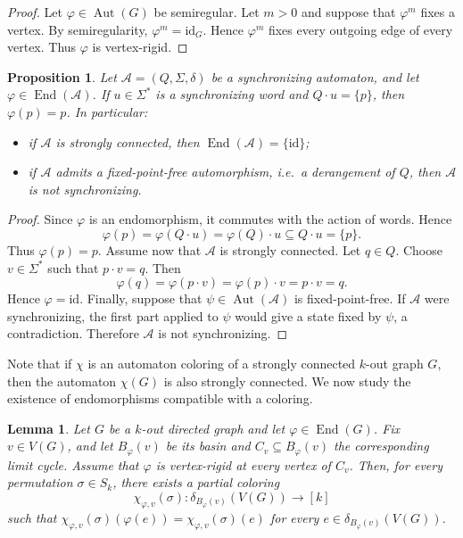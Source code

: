 \documentclass[a4paper,10pt]{amsart}
\theoremstyle{plain}
\newtheorem{lemma}[theorem]{Lemma}
\newtheorem{proposition}[theorem]{Proposition}
\theoremstyle{definition}
\DeclareMathOperator{\Aut}{Aut}
\DeclareMathOperator{\End}{End}
\newcommand{\id}{\mathrm{id}}
\begin{document}
\begin{proof}
Let $\varphi\in\Aut(G)$ be semiregular. Let $m>0$ and suppose that $\varphi^m$ fixes a vertex.
By semiregularity, $\varphi^m=\id_G$. Hence $\varphi^m$ fixes every outgoing edge of every vertex.
Thus $\varphi$ is vertex-rigid.
\end{proof}
\begin{proposition}\label{pro: synch and automorphisms}
Let $\mathcal A=(Q,\Sigma,\delta)$ be a synchronizing automaton, and let $\varphi\in\End(\mathcal A)$.
If $u\in\Sigma^*$ is a synchronizing word and $Q\cdot u=\{p\}$, then $\varphi(p)=p$.
In particular:
\begin{itemize}
\item if $\mathcal A$ is strongly connected, then $\End(\mathcal A)=\{\id\}$;
\item if $\mathcal A$ admits a fixed-point-free automorphism, i.e.\ a derangement of $Q$, then $\mathcal A$ is not synchronizing.
\end{itemize}
\end{proposition}
\begin{proof}
Since $\varphi$ is an endomorphism, it commutes with the action of words. Hence
\[
\varphi(p)
=
\varphi(Q\cdot u)
=
\varphi(Q)\cdot u
\subseteq
Q\cdot u
=
\{p\}.
\]
Thus $\varphi(p)=p$. Assume now that $\mathcal A$ is strongly connected. Let $q\in Q$. Choose $v\in\Sigma^*$ such that
$p\cdot v=q$. Then
\[
\varphi(q)
=
\varphi(p\cdot v)
=
\varphi(p)\cdot v
=
p\cdot v
=
q.
\]
Hence $\varphi=\id$.
Finally, suppose that $\psi\in\Aut(\mathcal A)$ is fixed-point-free. If $\mathcal A$ were synchronizing,
the first part applied to $\psi$ would give a state fixed by $\psi$, a contradiction. Therefore
$\mathcal A$ is not synchronizing.
\end{proof}
Note that if $\chi$ is an automaton coloring of a strongly connected $k$-out graph $G$, then the automaton $\chi(G)$ is also strongly connected. We now study the existence of endomorphisms compatible with a coloring.

\begin{lemma}\label{lem:compatible-coloring-partial}
Let $G$ be a $k$-out directed graph and let $\varphi\in \End(G)$. Fix $v\in V(G)$, and let $B_\varphi(v)$ be its basin and $C_v\subseteq B_\varphi(v)$ the corresponding limit cycle. Assume that $\varphi$ is vertex-rigid at every vertex of $C_v$. Then, for every permutation $\sigma\in S_k$, there exists a partial coloring
\[
\chi_{\varphi,v}(\sigma):\delta_{B_\varphi(v)}(V(G))\to [k]
\]
such that $\chi_{\varphi,v}(\sigma)(\varphi(e))=\chi_{\varphi,v}(\sigma)(e)$ for every $e\in \delta_{B_\varphi(v)}(V(G))$.
\end{lemma}
\end{document}

